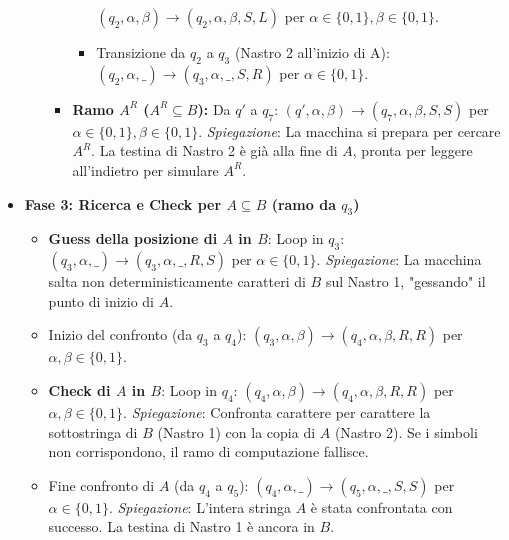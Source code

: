 \documentclass[a4paper]{article}
\begin{document}
\begin{itemize}
\begin{itemize}
\begin{itemize}
\begin{itemize}
                                $(q_2, \alpha, \beta) \to (q_2, \alpha, \beta, S, L)$ per $\alpha \in \{0, 1\}, \beta \in \{0, 1\}$.
                            \item Transizione da $q_2$ a $q_3$ (Nastro 2 all'inizio di A):
                                $(q_2, \alpha, \text{\_}) \to (q_3, \alpha, \text{\_}, S, R)$ per $\alpha \in \{0, 1\}$.
                        \end{itemize}
                    \item \textbf{Ramo $A^R$ ($A^R \subseteq B$):} Da $q'$ a $q_7$:
                        $(q', \alpha, \beta) \to (q_7, \alpha, \beta, S, S)$ per $\alpha \in \{0, 1\}, \beta \in \{0, 1\}$.
                        \textit{Spiegazione}: La macchina si prepara per cercare $A^R$. La testina di Nastro 2 è già alla fine di $A$, pronta per leggere all'indietro per simulare $A^R$.
                \end{itemize}
        \end{itemize}
    \item \textbf{Fase 3: Ricerca e Check per $A \subseteq B$ (ramo da $q_3$)}
        \begin{itemize}
            \item \textbf{Guess della posizione di $A$ in $B$}: Loop in $q_3$:
                $(q_3, \alpha, \text{\_}) \to (q_3, \alpha, \text{\_}, R, S)$ per $\alpha \in \{0, 1\}$.
                \textit{Spiegazione}: La macchina salta non deterministicamente caratteri di $B$ sul Nastro 1, "gessando" il punto di inizio di $A$.
            \item Inizio del confronto (da $q_3$ a $q_4$):
                $(q_3, \alpha, \beta) \to (q_4, \alpha, \beta, R, R)$ per $\alpha, \beta \in \{0, 1\}$.
            \item \textbf{Check di $A$ in $B$}: Loop in $q_4$:
                $(q_4, \alpha, \beta) \to (q_4, \alpha, \beta, R, R)$ per $\alpha, \beta \in \{0, 1\}$.
                \textit{Spiegazione}: Confronta carattere per carattere la sottostringa di $B$ (Nastro 1) con la copia di $A$ (Nastro 2). Se i simboli non corrispondono, il ramo di computazione fallisce.
            \item Fine confronto di $A$ (da $q_4$ a $q_5$):
                $(q_4, \alpha, \text{\_}) \to (q_5, \alpha, \text{\_}, S, S)$ per $\alpha \in \{0, 1\}$.
                \textit{Spiegazione}: L'intera stringa $A$ è stata confrontata con successo. La testina di Nastro 1 è ancora in $B$.
        \end{itemize}

\end{itemize}
\end{document}
